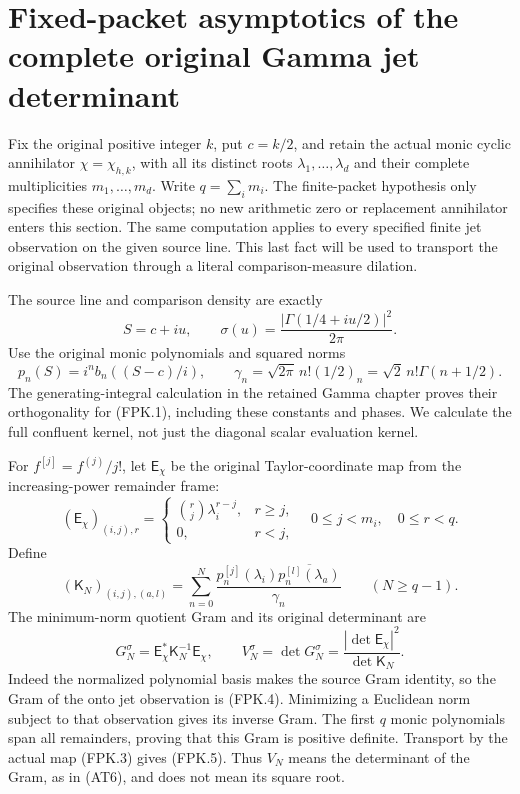 \section{Fixed-packet asymptotics of the complete original Gamma jet determinant}
\label{CFStage:sec:fixed-gamma-full-jet}

Fix the original positive integer $k$, put $c=k/2$, and retain the
actual monic cyclic annihilator $\chi=\chi_{h,k}$, with all its
distinct roots $\lambda_1,\ldots,\lambda_d$ and their complete
multiplicities $m_1,\ldots,m_d$. Write $q=\sum_i m_i$.
The finite-packet hypothesis only specifies these original objects;
no new arithmetic zero or replacement annihilator enters this section.
The same computation applies to every specified finite jet observation
on the given source line. This last fact will be used to transport the
original observation through a literal comparison-measure dilation.

The source line and comparison density are exactly
\[
 S=c+iu,\qquad
 \sigma(u)=\frac{|\Gamma(1/4+iu/2)|^2}{2\pi}.
 \tag{FPK.1}
\]
Use the original monic polynomials and squared norms
\[
 p_n(S)=i^n b_n((S-c)/i),\qquad
 \gamma_n=\sqrt{2\pi}\,n!(1/2)_n
          =\sqrt2\,n!\Gamma(n+1/2).
 \tag{FPK.2}
\]
The generating-integral calculation in the retained Gamma chapter proves
their orthogonality for (FPK.1), including these constants and phases.
We calculate the full confluent kernel, not just the diagonal scalar
evaluation kernel.

For $f^{[j]}=f^{(j)}/j!$, let $\mathsf E_\chi$ be the original
Taylor-coordinate map from the increasing-power remainder frame:
\[
 (\mathsf E_\chi)_{(i,j),r}
   =\begin{cases}\binom rj\lambda_i^{r-j},&r\geq j,\\0,&r<j,
     \end{cases}
 \quad 0\leq j<m_i,\quad 0\leq r<q.
 \tag{FPK.3}
\]
Define
\[
 (\mathsf K_N)_{(i,j),(a,l)}
   =\sum_{n=0}^N
      \frac{p_n^{[j]}(\lambda_i)
                   \overline{p_n^{[l]}(\lambda_a)}}{\gamma_n}
       \qquad(N\geq q-1).
 \tag{FPK.4}
\]
The minimum-norm quotient Gram and its original determinant are
\[
 G_N^\sigma=\mathsf E_\chi^*\mathsf K_N^{-1}\mathsf E_\chi,
 \qquad V_N^\sigma=\det G_N^\sigma
         =\frac{|\det\mathsf E_\chi|^2}{\det\mathsf K_N}.
 \tag{FPK.5}
\]
Indeed the normalized polynomial basis makes the source Gram identity,
so the Gram of the onto jet observation is (FPK.4). Minimizing a
Euclidean norm subject to that observation gives its inverse Gram.
The first $q$ monic polynomials span all remainders, proving that this
Gram is positive definite. Transport by the actual map (FPK.3) gives
(FPK.5). Thus $V_N$ means the determinant of the Gram, as in (AT6),
and does not mean its square root.

